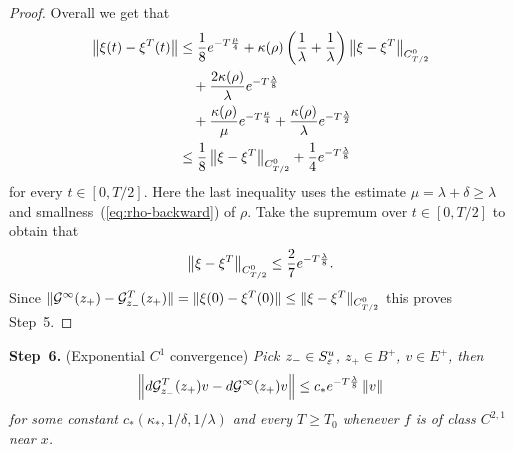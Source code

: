 \documentclass{article}
\begin{document}
\begin{proof}
Overall we get that
\begin{equation}\label{eq:arrive-at}
\begin{split}
     \Norm{\xi(t)-\xi^T(t)}
     &\le 
      \frac{1}{8} e^{-T\frac{\mu}{4}}
      +
      \kappa(\rho)
      \left(\frac{1}{\lambda}+\frac{1}{\lambda}\right)
      \Norm{\xi-\xi^T}_{C^0_{T/2}}
   \\
      &\quad
      +
      \frac{2\kappa(\rho)}{\lambda}
      e^{-T\frac{\lambda}{8}}
   \\
      &\quad
      +
      \frac{\kappa(\rho)}{\mu}
      e^{-T\frac{\mu}{4}}
      + 
      \frac{\kappa(\rho)}{\lambda}
      e^{-T\frac{\lambda}{2}}
   \\
    &\le
     \frac{1}{8}
     \Norm{\xi-\xi^T}_{C^0_{T/2}}
     +
     \frac{1}{4} e^{-T\frac{\lambda}{8}}
\end{split}
\end{equation}
for every $t\in [0,T/2]$.
Here the last inequality uses the estimate
$\mu=\lambda+\delta\ge\lambda$ and
smallness~(\ref{eq:rho-backward}) of $\rho$.
Take the supremum over $t\in [0,T/2]$
to obtain that
\begin{equation}\label{eq:xi-eta}
     \Norm{\xi-\xi^T}_{C^0_{T/2}}
     \le \frac{2}{7} e^{-T\frac{\lambda}{8}}.
\end{equation}
Since
$
     \mathopen\|{\mathcal{G}}^\infty(z_+)-{\mathcal{G}}^T_{z_-}(z_+)\mathclose\|=\mathopen\|\xi(0)-\xi^T(0)\mathclose\|
     \le\mathopen\|\xi-\xi^T\mathclose\|_{C^0_{T/2}}
$
this proves Step~5.
\end{proof}


\vspace{.1cm}
\noindent
{\bf Step~6.}
{\rm (Exponential $C^1$ convergence)}
{\it Pick ${z_-}\in S^u_{\varepsilon}$, $z_+\in B^+$, 
$v\in E^+$, then
$$
     \left\|d{\mathcal{G}}^T_{z_-}(z_+)v-d{\mathcal{G}}^\infty(z_+)v\right\|
     \le c_* e^{-T\frac{\lambda}{8}}\left\|v\right\|
$$
for some constant $c_*(\kappa_*,1/\delta,1/\lambda)$
and every $T\ge T_0$ whenever $f$ is of class $C^{2,1}$ near $x$.
}
\end{document}
